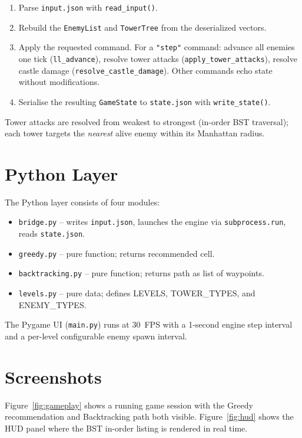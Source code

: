 \documentclass[12pt,a4paper]{report}
\begin{document}
\begin{enumerate}
  \item Parse \texttt{input.json} with \texttt{read\_input()}.
  \item Rebuild the \texttt{EnemyList} and \texttt{TowerTree} from the
        deserialized vectors.
  \item Apply the requested command.
        For a \texttt{"step"} command: advance all enemies one tick
        (\texttt{ll\_advance}), resolve tower attacks
        (\texttt{apply\_tower\_attacks}), resolve castle damage
        (\texttt{resolve\_castle\_damage}).
        Other commands echo state without modifications.
  \item Serialise the resulting \texttt{GameState} to \texttt{state.json}
        with \texttt{write\_state()}.
\end{enumerate}

Tower attacks are resolved from weakest to strongest (in-order BST traversal);
each tower targets the \textit{nearest} alive enemy within its Manhattan
radius.

\section{Python Layer}

The Python layer consists of four modules:
\begin{itemize}
  \item \texttt{bridge.py} -- writes \texttt{input.json}, launches the engine
        via \texttt{subprocess.run}, reads \texttt{state.json}.
  \item \texttt{greedy.py} -- pure function; returns recommended cell.
  \item \texttt{backtracking.py} -- pure function; returns path as list of
        waypoints.
  \item \texttt{levels.py} -- pure data; defines LEVELS, TOWER\_TYPES, and
        ENEMY\_TYPES.
\end{itemize}

The Pygame UI (\texttt{main.py}) runs at 30~FPS with a 1-second engine step
interval and a per-level configurable enemy spawn interval.

\section{Screenshots}

Figure~\ref{fig:gameplay} shows a running game session with the Greedy
recommendation and Backtracking path both visible.
Figure~\ref{fig:hud} shows the HUD panel where the BST in-order listing
is rendered in real time.
\end{document}
